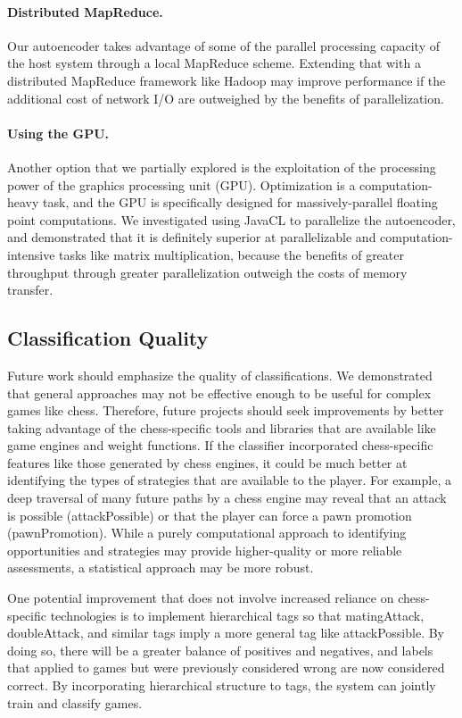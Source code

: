 \documentclass[11pt]{article}
\begin{document}
\paragraph{Distributed MapReduce.}
Our autoencoder takes advantage of some of the parallel processing capacity of the host system through a local MapReduce scheme. Extending that with a distributed MapReduce framework like Hadoop may improve performance if the additional cost of network I/O are outweighed by the benefits of parallelization.

\paragraph{Using the GPU.}
Another option that we partially explored is the exploitation of the processing power of the graphics processing unit (GPU). Optimization is a computation-heavy task, and the GPU is specifically designed for massively-parallel floating point computations. We investigated using JavaCL to parallelize the autoencoder, and demonstrated that it is definitely superior at parallelizable and computation-intensive tasks like matrix multiplication, because the benefits of greater throughput through greater parallelization outweigh the costs of memory transfer.

\subsection{Classification Quality}
Future work should emphasize the quality of classifications. We demonstrated that general approaches may not be effective enough to be useful for complex games like chess. Therefore, future projects should seek improvements by better taking advantage of the chess-specific tools and libraries that are available like game engines and weight functions. If the classifier incorporated chess-specific features like those generated by chess engines, it could be much better at identifying the types of strategies that are available to the player. For example, a deep traversal of many future paths by a chess engine may reveal that an attack is possible (attackPossible) or that the player can force a pawn promotion (pawnPromotion). While a purely computational approach to identifying opportunities and strategies may provide higher-quality or more reliable assessments, a statistical approach may be more robust. %

One potential improvement that does not involve increased reliance on chess-specific technologies is to implement hierarchical tags so that matingAttack, doubleAttack, and similar tags imply a more general tag like attackPossible. By doing so, there will be a greater balance of positives and negatives, and labels that applied to games but were previously considered wrong are now considered correct. By incorporating hierarchical structure to tags, the system can jointly train and classify games.
\end{document}

